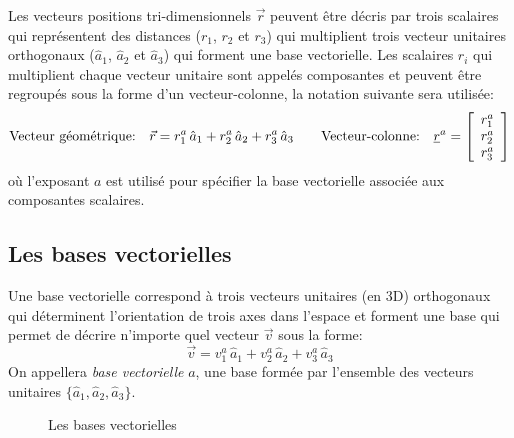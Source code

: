 Les vecteurs positions tri-dimensionnels $\vec{r}$ peuvent être décris par trois scalaires qui représentent des distances ($r_1$, $r_2$ et $r_3$) qui multiplient trois vecteur unitaires orthogonaux ($\hat{a}_1$, $\hat{a}_2$ et $\hat{a}_3$) qui forment une base vectorielle.  Les scalaires $r_i$ qui multiplient chaque vecteur unitaire sont appelés composantes et peuvent être regroupés sous la forme d'un vecteur-colonne, la notation suivante sera utilisée:
\begin{equation}
\text{Vecteur géométrique:}\quad
\vec{r} = r_1^a \, \hat{a}_{1} + r_2^a \, \hat{a}_{2} + r_3^a \, \hat{a}_{3}
\quad \quad 
\text{Vecteur-colonne:}\quad
\underline{r}^{a} = \left[ \begin{array}{c} r_1^a \\ r_2^a \\ r_3^a  \end{array} \right] 
\label{eq:veccoldef}
\end{equation} 
où l'exposant $a$ est utilisé pour spécifier la base vectorielle associée aux composantes scalaires. 




\subsection{Les bases vectorielles}
Une base vectorielle correspond à trois vecteurs unitaires (en 3D) orthogonaux qui déterminent l'orientation de trois axes dans l'espace et forment une base qui permet de décrire n'importe quel vecteur $\vec{v}$ sous la forme:
\begin{equation}
\vec{v} = v_1^a \, \hat{a}_{1} + v_2^a \, \hat{a}_{2} + v_3^a \, \hat{a}_{3}
\label{eq:vecbasis}
\end{equation} 
On appellera \textit{base vectorielle} $a$, une base formée par l'ensemble des vecteurs unitaires $\{\hat{a}_{1},\hat{a}_{2},\hat{a}_{3}\}$.
%
\begin{figure}[htpb]
        \centering
				\hspace{10pt}
				\hspace{10pt}
        \caption{Les bases vectorielles}
				\label{fig:vecbasis}
\end{figure}

